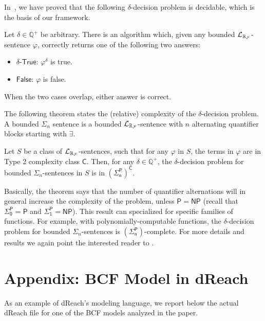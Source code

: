 In~\cite{gao12a}, we have proved that the following $\delta$-decision problem is decidable, which is the basis of our framework.
\begin{theorem}\label{delta-decide} Let $\delta\in\mathbb{Q}^+$ be
arbitrary. There is an algorithm which, given any bounded $\mathcal{L}_{\mathbb{R}_{\mathcal{F}}}$-sentence $\varphi$,
correctly returns one of the following two answers:
\begin{itemize}
\item $\delta$-$\mathsf{True}$: $\varphi^{\delta}$ is true.
\item $\mathsf{False}$: $\varphi$ is false.
\end{itemize}
When the two cases overlap, either answer is correct.
\end{theorem}
The following theorem states the (relative) complexity of the $\delta$-decision problem.
A bounded $\Sigma_n$ sentence is a bounded $\mathcal{L}_{\mathbb{R}_{\mathcal{F}}}$-sentence with $n$ alternating quantifier blocks 
starting with $\exists$. 
\begin{theorem}\label{compmain}
Let $S$ be a class of $\mathcal{L}_{\mathbb{R}_{\mathcal{F}}}$-sentences, such that for any $\varphi$ in $S$, the terms in $\varphi$ are in Type 2 complexity class $\mathsf{C}$. Then, for any $\delta\in \mathbb{Q}^+$, the $\delta$-decision problem for bounded $\Sigma_n$-sentences in $S$ is in $\mathsf{(\Sigma_n^P)^C}$.
\end{theorem}
Basically, the theorem says that the number of quantifier alternations will in general increase 
the complexity of the problem, unless $\mathsf{P}=\mathsf{NP}$ (recall that $\mathsf{\Sigma_0^P}=\mathsf{P}$ 
and $\mathsf{\Sigma_1^P}=\mathsf{NP}$).
This result can specialized for specific families of functions. For example, with polynomially-computable 
functions, the $\delta$-decision problem for bounded $\Sigma_n$-sentences is $\mathsf{(\Sigma_n^P)}$-complete.
For more details and results we again point the interested reader to \cite{gao12b}.

\newpage
\section*{Appendix: BCF Model in dReach}
As an example of dReach's modeling language, we report below the actual dReach file for one of 
the BCF models analyzed in the paper.

